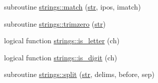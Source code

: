 \begin{DoxyCompactItemize}
\item 
subroutine \hyperlink{namespacestrings_ad5ead0bc741b619b8e30528ccebbd057}{strings\+::match} (\hyperlink{_s_o_l_w_e_i_g__misc_8f95_a77a2ca74046c88062aa8333bf1eaca05}{str}, ipos, imatch)
\item 
subroutine \hyperlink{namespacestrings_a18777b9741e00afdfe3ec5f5fa16ca46}{strings\+::trimzero} (\hyperlink{_s_o_l_w_e_i_g__misc_8f95_a77a2ca74046c88062aa8333bf1eaca05}{str})
\item 
logical function \hyperlink{namespacestrings_a3b44a9a233716da3271b645eee79d8f0}{strings\+::is\+\_\+letter} (ch)
\item 
logical function \hyperlink{namespacestrings_a91d4d50cfe3e624152f5234d89aa6dc5}{strings\+::is\+\_\+digit} (ch)
\item 
subroutine \hyperlink{namespacestrings_a12ec697adfa3201deadb7777456db11c}{strings\+::split} (\hyperlink{_s_o_l_w_e_i_g__misc_8f95_a77a2ca74046c88062aa8333bf1eaca05}{str}, delims, before, sep)
\end{DoxyCompactItemize}
